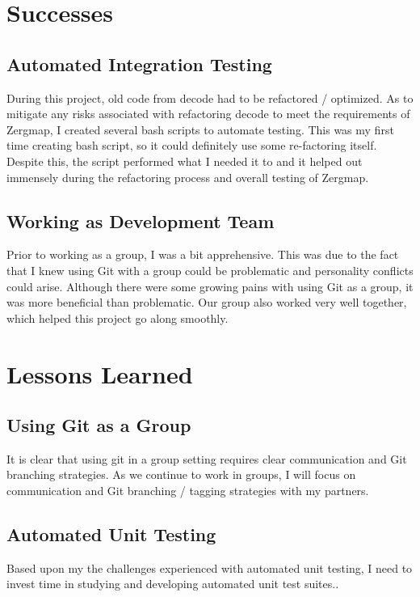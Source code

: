 \documentclass{article}
\begin{document}
\section{Successes}

\subsection{Automated Integration Testing}

During this project, old code from decode had to be refactored / optimized. As to mitigate any risks associated with refactoring decode to meet the requirements of Zergmap, I created several bash scripts to automate testing. This was my first time creating bash script, so it could definitely use some re-factoring itself. Despite this, the script performed what I needed it to and it helped out immensely during the refactoring process and overall testing of Zergmap.

\subsection{Working as Development Team}

Prior to working as a group, I was a bit apprehensive. This was due to the fact that I knew using Git with a group could be problematic and personality conflicts could arise. Although there were some growing pains with using Git as a group, it was more beneficial than problematic. Our group also worked very well together, which helped this project go along smoothly.

\section {Lessons Learned}

\subsection{Using Git as a Group}

It is clear that using git in a group setting requires clear communication and Git branching strategies. As we continue to work in groups, I will focus on communication and Git branching / tagging strategies with my partners.

\subsection{Automated Unit Testing}

Based upon my the challenges experienced with automated unit testing, I need to invest time in studying and developing automated unit test suites..
\end{document}
